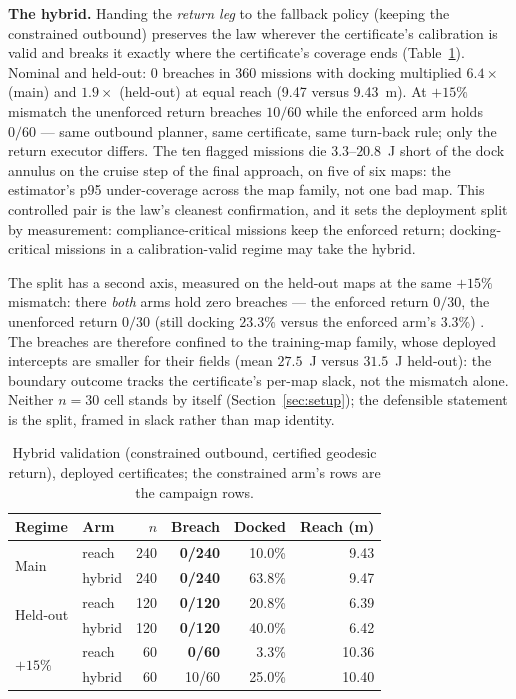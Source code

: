 \documentclass[preprint,12pt]{elsarticle}
\begin{document}
\textbf{The hybrid.} Handing the \emph{return leg} to the fallback
policy (keeping the constrained outbound) preserves the law wherever
the certificate's calibration is valid and breaks it exactly where
the certificate's coverage ends (Table~\ref{tab:hybrid}). Nominal and
held-out: $0$ breaches in $360$ missions with docking multiplied
$6.4\times$ (main) and $1.9\times$ (held-out) at equal reach
(9.47 versus 9.43~m).
 At $+15\%$ mismatch the unenforced return breaches $10/60$ while
the enforced arm holds $0/60$ --- same outbound planner, same
certificate, same turn-back rule; only the return executor differs.
The ten flagged missions die $3.3$--$20.8$~J short of the dock annulus
on the cruise step of the final approach, on five of six maps: the
estimator's p95 under-coverage across the map family, not one bad
map.
 This controlled pair is the law's cleanest confirmation, and it
sets the deployment split by measurement: compliance-critical
missions keep the enforced return; docking-critical missions in a
calibration-valid regime may take the hybrid.

The split has a second axis, measured on the held-out maps at the same
$+15\%$ mismatch: there \emph{both} arms hold zero breaches --- the
enforced return $0/30$, the unenforced return $0/30$ (still docking
$23.3\%$ versus the enforced arm's $3.3\%$)
. The breaches are therefore confined to the training-map family,
whose deployed intercepts are smaller for their fields (mean $27.5$~J
versus $31.5$~J held-out): the boundary outcome tracks the
certificate's per-map slack, not the mismatch alone. Neither
$n{=}30$ cell stands by itself (Section~\ref{sec:setup}); the
defensible statement is the split, framed in slack rather than map
identity.

\begin{table}[!t]
\caption{Hybrid validation (constrained outbound, certified geodesic
return), deployed certificates; the constrained arm's rows are the
campaign rows.}
\label{tab:hybrid}
\centering
\begin{tabular}{llrrrr}
\toprule
Regime & Arm & $n$ & Breach & Docked & Reach (m)\\
\midrule
\multirow{2}{*}{Main}
 & reach & 240 & \textbf{0/240} & 10.0\% & 9.43\\
 & hybrid & 240 & \textbf{0/240} & 63.8\% & 9.47\\
\midrule
\multirow{2}{*}{Held-out}
 & reach & 120 & \textbf{0/120} & 20.8\% & 6.39\\
 & hybrid & 120 & \textbf{0/120} & 40.0\% & 6.42\\
\midrule
\multirow{2}{*}{$+15\%$}
 & reach & 60 & \textbf{0/60} & 3.3\% & 10.36\\
 & hybrid & 60 & 10/60 & 25.0\% & 10.40\\
\bottomrule
\end{tabular}
\end{table}
\end{document}
